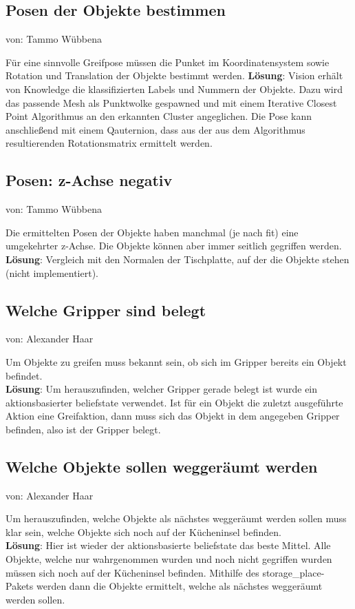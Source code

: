\documentclass{suturo}
\makeatletter
\newcommand{\chapterauthor}[1]{%
  {\parindent0pt\vspace*{-27pt}%
  \linespread{0}\small\begin{flushright}von: #1\end{flushright}%
  \par\nobreak\vspace*{0pt}}
  \@afterheading%
}
\makeatother
\begin{document}
\subsection{Posen der Objekte bestimmen}
\chapterauthor{Tammo Wübbena}
Für eine sinnvolle Greifpose müssen die Punket im Koordinatensystem sowie Rotation und Translation der Objekte bestimmt werden. 
\textbf{Lösung}: Vision erhält von Knowledge die klassifizierten Labels und Nummern der Objekte. Dazu wird das passende Mesh als Punktwolke gespawned und mit einem Iterative Closest Point Algorithmus an den erkannten Cluster angeglichen. Die Pose kann anschließend mit einem Qauternion, dass aus der aus dem Algorithmus resultierenden Rotationsmatrix ermittelt werden.

\subsection{Posen: z-Achse negativ}
\chapterauthor{Tammo Wübbena}
Die ermittelten Posen der Objekte haben manchmal (je nach fit) eine umgekehrter z-Achse. Die Objekte können aber immer seitlich gegriffen werden.
\textbf{Lösung}: Vergleich mit den Normalen der Tischplatte, auf der die Objekte stehen (nicht implementiert).

\subsection{Welche Gripper sind belegt}
\chapterauthor{Alexander Haar}
Um Objekte zu greifen muss bekannt sein, ob sich im Gripper bereits ein Objekt befindet.\\
\textbf{Lösung}: Um herauszufinden, welcher Gripper gerade belegt ist wurde ein aktionsbasierter beliefstate verwendet. Ist für ein Objekt die zuletzt ausgeführte Aktion eine Greifaktion, dann muss sich das Objekt in dem angegeben Gripper befinden, also ist der Gripper belegt.

\subsection{Welche Objekte sollen weggeräumt werden}
\chapterauthor{Alexander Haar} 
Um herauszufinden, welche Objekte als nächstes weggeräumt werden sollen muss klar sein, welche Objekte sich noch auf der Kücheninsel befinden.\\
\textbf{Lösung}: Hier ist wieder der aktionsbasierte beliefstate das beste Mittel. Alle Objekte, welche nur wahrgenommen wurden und noch nicht gegriffen wurden müssen sich noch auf der Kücheninsel befinden. Mithilfe des storage\_place- Pakets werden dann die Objekte ermittelt, welche als nächstes weggeräumt werden sollen.
\end{document}

